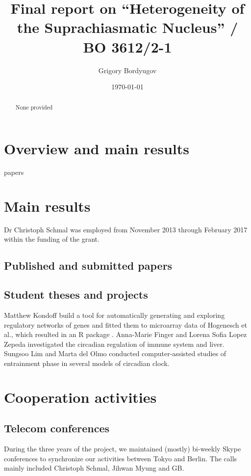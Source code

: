 \documentclass[a4paper]{article}
\title{Final report on ``Heterogeneity of the Suprachiasmatic
Nucleus'' / BO 3612/2-1}
\author{Grigory Bordyugov \mailhref{grigory.bordyugov@gmail.com}}
\date{\today}
\begin{document}
\maketitle

\begin{abstract}
  None provided
\end{abstract}

\tableofcontents

\section{Overview and main results}
papers
\cite{bordyugov2015tuning,schmal2015theoretical,kondoff2015modeling,schmal2017moran,wagner2017plant,myung2017choroid,schmal2017measuring}

\section{Main results}
Dr Christoph Schmal was employed from November 2013 through February
2017 within the funding of the grant.

\subsection{Published and submitted papers}

\subsection{Student theses and projects}
Matthew Kondoff build a tool for automatically generating and
exploring regulatory networks of genes and fitted them to microarray
data of Hogenesch et al., which resulted in an R package
\cite{kondoff2015modeling}. Anna-Marie Finger and Lorena Sofia Lopez
Zepeda investigated the circadian regulation of immune system and
liver.  Sungsoo Lim and Marta del Olmo conducted computer-assisted
studies of entrainment phase in several models of circadian clock.



\section{Cooperation activities}

\subsection{Telecom conferences}
During the three years of the project, we maintained (mostly)
bi-weekly Skype conferences to synchronize our activities between
Tokyo and Berlin. The calls mainly included Christoph Schmal, Jihwan
Myung and GB.
\end{document}
